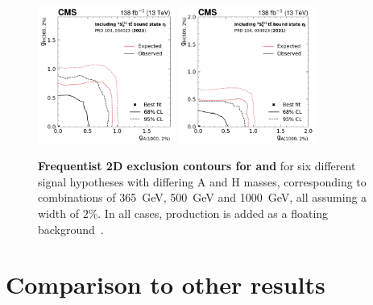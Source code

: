 \begin{figure}[!ph]
    \includegraphics[width=0.4\textwidth]{figures/ah/contour/A_m1000_w2p0__H_m365_w2p0_fc-contour.pdf}%
    \hspace*{0.05\textwidth}%
    \includegraphics[width=0.4\textwidth]{figures/ah/contour/A_m1000_w2p0__H_m500_w2p0_fc-contour.pdf}
    \caption{%
        \textbf{Frequentist 2D exclusion contours for \gAtt and \gHtt} for six different signal hypotheses with differing A and H masses, corresponding to combinations of \SI{365}{\GeV}, \SI{500}{\GeV} and \SI{1000}{\GeV}, all assuming a width of $2\%$. In all cases, \etat production is added as a floating background~\cite{CMS:HIG-22-013}.
    }
    \label{fig:ah:limit_2D_ah_etat_1}
\end{figure}

\newpage

\section{Comparison to other results}
\label{sec:ah:comparison}


